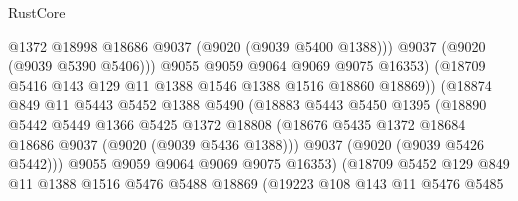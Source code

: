 \begin{lexlean}{RustCore}
\begin{coremodule}
                                    @1372
                                    @18998
                                    @18686
                                    @9037
                                    (@9020 (@9039 @5400 @1388)))
                                  @9037
                                  (@9020 (@9039 @5390 @5406)))
                                @9055
                                @9059
                                @9064
                                @9069
                                @9075
                                @16353)
                              (@18709 @5416 @143 @129 @11 @1388 @1546 @1388 @1516 @18860 @18869))
                            (@18874
                              @849
                              @11
                              @5443
                              @5452
                              @1388
                              @5490
                              (@18883
                                @5443
                                @5450
                                @1395
                                (@18890
                                  @5442
                                  @5449
                                  @1366
                                  @5425
                                  @1372
                                  @18808
                                  (@18676
                                    @5435
                                    @1372
                                    @18684
                                    @18686
                                    @9037
                                    (@9020 (@9039 @5436 @1388)))
                                  @9037
                                  (@9020 (@9039 @5426 @5442)))
                                @9055
                                @9059
                                @9064
                                @9069
                                @9075
                                @16353)
                              (@18709
                                @5452
                                @129
                                @849
                                @11
                                @1388
                                @1516
                                @5476
                                @5488
                                @18869
                                (@19223
                                  @108
                                  @143
                                  @11
                                  @5476
                                  @5485

\end{coremodule}
\end{lexlean}
